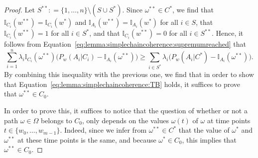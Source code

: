 \documentclass[10pt]{paper}
\theoremstyle{definition}
\newcommand{\ind}[1]{\mathbb{I}_{#1}}
\newcommand{\coloneqq}{:\!=}
\begin{document}
\begin{proof}
Let $S^{**}\coloneqq\{1,\dots,n\}\setminus(S\cup S^*)$. Since $\omega^{**}\in C^*$, we find that $\ind{C_i}(w^{**})=\ind{C_i}(w^{*})$ and $\ind{A_i}(w^{**})=\ind{A_i}(w^{*})$ for all $i\in S$, that $\ind{C_i}(w^{**})=1$ for all $i\in S^{*}$, and that $\ind{C_i}(w^{**})=0$ for all $i\in S^{**}$. Hence, it follows from Equation~\eqref{eq:lemma:simplechaincoherence:supremumreached} that
\begin{equation*}
\sum_{i=1}^n\lambda_i\ind{C_i}(\omega^{**})\bigl(P_w(A_i\vert C_i)-\ind{A_i}(\omega^{**})\bigr)
\geq
\sum_{i\in S^*}\lambda_i\bigl(P_w(A_i\vert C^*)-\ind{A_i}(\omega^{**})\bigr).
\end{equation*}
By combining this inequality with the previous one, we find that in order to show that Equation~\eqref{eq:lemma:simplechaincoherence:TB} holds, it suffices to prove that $\omega^{**}\in C_0$. 

In order to prove this, it suffices to notice that the question of whether or not a path $\omega\in\Omega$ belongs to $C_0$, only depends on the values $\omega(t)$ of $\omega$ at time points $t\in\{w_0,\dots,w_{m-1}\}$. Indeed, since we infer from $\omega^{**}\in C^*$ that the value of $\omega^*$ and $\omega^{**}$ at these time points is the same, and because $\omega^*\in C_0$, this implies that $\omega^{**}\in C_0$.
\end{proof}
\end{document}
